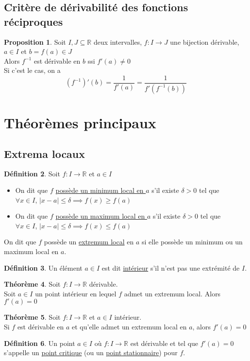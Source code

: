\documentclass[10pt,a4paper]{article}
\theoremstyle{definition}
\newtheorem{proposition}{Proposition}[section]
\newtheorem{theorem}[proposition]{Théorème}
\newtheorem{definition}[proposition]{Définition}
\begin{document}
\subsection{Critère de dérivabilité des fonctions réciproques}
\begin{proposition}
Soit $I, J \subseteq \mathbb{R}$ deux intervalles, $f: I \to J$ une bijection dérivable, $a \in I$ et $b = f(a) \in J$ \\
Alors $f^{-1}$ est dérivable en $b$ ssi $f'(a) \neq 0$ \\
Si c'est le cas, on a
\[(f^{-1})'(b) = \frac{1}{f'(a)} = \frac{1}{f'(f^{-1}(b))}\]
\end{proposition}

\section{Théorèmes principaux}
\subsection{Extrema locaux}
\begin{definition}
Soit $f: I \to \mathbb{R}$ et $a \in I$
\begin{itemize}
\item On dit que $f$ \uline{possède un minimum local en $a$} s'il existe $\delta > 0$ tel que \\
$\forall x \in I$, $|x - a| \leq \delta \implies f(x) \geq f(a)$
\item On dit que $f$ \uline{possède un maximum local en $a$} s'il existe $\delta > 0$ tel que \\
$\forall x \in I$, $|x - a| \leq \delta \implies f(x) \leq f(a)$
\end{itemize}
On dit que $f$ possède un \uline{extremum local} en $a$ si elle possède un minimum ou un maximum local en $a$.
\end{definition}
\begin{definition}
Un élément $a \in I$ est dit \uline{intérieur} s'il n'est pas une extrémité de $I$.
\end{definition}
\begin{theorem}
Soit $f: I \to \mathbb{R}$ dérivable. \\
Soit $a \in I$ un point intérieur en lequel $f$ admet un extremum local. Alors $f'(a) = 0$ 
\end{theorem}
\begin{theorem}
Soit $f: I \to \mathbb{R}$ et $a \in I$ intérieur. \\
Si $f$ est dérivable en $a$ et qu'elle admet un extremum local en $a$, alors $f'(a) = 0$
\end{theorem}
\begin{definition}
Un point $a \in I$ où $f: I \to \mathbb{R}$ est dérivable et tel que $f'(a) = 0$ s'appelle un \uline{point critique} (ou un \uline{point stationnaire}) pour $f$.
\end{definition}
\end{document}
